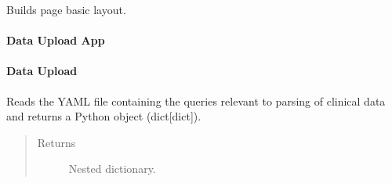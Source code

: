 \documentclass[letterpaper,10pt,english]{sphinxmanual}
\begin{document}
\begin{fulllineitems}
\begin{fulllineitems}
\end{fulllineitems}


\begin{fulllineitems}
\label{\detokenize{_autosummary/report_manager.apps:report_manager.apps.basicApp.BasicApp.build_page}}
Builds page basic layout.

\end{fulllineitems}


\end{fulllineitems}



\paragraph{Data Upload App}
\label{\detokenize{_autosummary/report_manager.apps:data-upload-app}}

\paragraph{Data Upload}
\label{\detokenize{_autosummary/report_manager.apps:module-report_manager.apps.dataUpload}}\label{\detokenize{_autosummary/report_manager.apps:data-upload}}

\begin{fulllineitems}
\label{\detokenize{_autosummary/report_manager.apps:report_manager.apps.dataUpload.get_data_upload_queries}}
Reads the YAML file containing the queries relevant to parsing of clinical data and     returns a Python object (dict{[}dict{]}).
\begin{quote}\begin{description}
\item[{Returns}] \leavevmode
Nested dictionary.

\end{description}\end{quote}

\end{fulllineitems}
\end{document}
